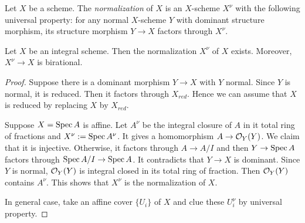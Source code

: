     \begin{definition}
        Let $X$ be a scheme.
        The \textit{normalization} of $X$ is an $X$-scheme $X^\nu$ with the following universal property:
        for any normal $X$-scheme $Y$ with dominant structure morphism, its structure morphism $Y \to X$ factors through $X^\nu$.
    \end{definition}

    \begin{proposition}
        Let $X$ be an integral scheme.
        Then the normalization $X^\nu$ of $X$ exists.
        Moreover, $X^\nu \to X$ is birational.
    \end{proposition}
    \begin{proof}
        Suppose there is a dominant morphism $Y \to X$ with $Y$ normal.
        Since $Y$ is normal, it is reduced.
        Then it factors through $X_{red}$.
        Hence we can assume that $X$ is reduced by replacing $X$ by $X_{red}$.

        Suppose $X = \operatorname{Spec} A$ is affine.
        Let $A^\nu$ be the integral closure of $A$ in it total ring of fractions and $X^\nu := \operatorname{Spec} A^\nu$.
        It gives a homomorphism $A \to {\mathcal{O}}_Y(Y)$.
        We claim that it is injective.
        Otherwise, it factors through $A \to A/I$ and then $Y \to \operatorname{Spec} A$ factors through $\operatorname{Spec} A/I \to \operatorname{Spec} A$.
        It contradicts that $Y \to X$ is dominant.
        Since $Y$ is normal, ${\mathcal{O}}_Y(Y)$ is integral closed in its total ring of fraction.
        Then ${\mathcal{O}}_Y(Y)$ contains $A^\nu$.
        This shows that $X^\nu$ is the normalization of $X$.

        In general case, take an affine cover $\{U_i\}$ of $X$ and clue these $U_i^\nu$ by universal property.
    \end{proof}


